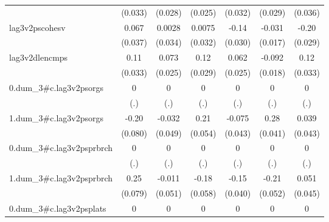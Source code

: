 \begin{table}[htbp]
\begin{tabular}{l*{6}{c}}
            &     (0.033)         &     (0.028)         &     (0.025)         &     (0.032)         &     (0.029)         &     (0.036)         \\
[1em]
lag3v2pscohesv&       0.067         &      0.0028         &      0.0075         &       -0.14\sym{***}&      -0.031         &       -0.20\sym{***}\\
            &     (0.037)         &     (0.034)         &     (0.032)         &     (0.030)         &     (0.017)         &     (0.029)         \\
[1em]
lag3v2dlencmps&        0.11\sym{**} &       0.073\sym{**} &        0.12\sym{***}&       0.062\sym{*}  &      -0.092\sym{***}&        0.12\sym{***}\\
            &     (0.033)         &     (0.025)         &     (0.029)         &     (0.025)         &     (0.018)         &     (0.033)         \\
[1em]
0.dum\_3#c.lag3v2psorgs&           0         &           0         &           0         &           0         &           0         &           0         \\
            &         (.)         &         (.)         &         (.)         &         (.)         &         (.)         &         (.)         \\
[1em]
1.dum\_3#c.lag3v2psorgs&       -0.20\sym{*}  &      -0.032         &        0.21\sym{***}&      -0.075         &        0.28\sym{***}&       0.039         \\
            &     (0.080)         &     (0.049)         &     (0.054)         &     (0.043)         &     (0.041)         &     (0.043)         \\
[1em]
0.dum\_3#c.lag3v2psprbrch&           0         &           0         &           0         &           0         &           0         &           0         \\
            &         (.)         &         (.)         &         (.)         &         (.)         &         (.)         &         (.)         \\
[1em]
1.dum\_3#c.lag3v2psprbrch&        0.25\sym{**} &      -0.011         &       -0.18\sym{**} &       -0.15\sym{***}&       -0.21\sym{***}&       0.051         \\
            &     (0.079)         &     (0.051)         &     (0.058)         &     (0.040)         &     (0.052)         &     (0.045)         \\
[1em]
0.dum\_3#c.lag3v2psplats&           0         &           0         &           0         &           0         &           0         &           0         \\

\end{tabular}
\end{table}
